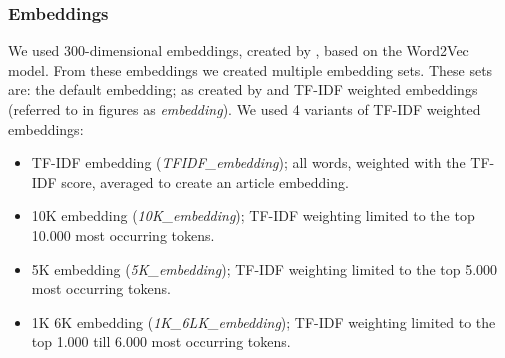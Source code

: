 \documentclass[runningheads]{llncs}
\begin{document}
\subsubsection{Embeddings}
We used 300-dimensional embeddings, created by \citet{Truong2017Thesis}, based on the Word2Vec model. From these embeddings we created multiple embedding sets. These sets are: the default embedding; as created by \citet{Truong2017Thesis} and TF-IDF weighted embeddings (referred to in figures as \textit{embedding}). We used 4 variants of TF-IDF weighted embeddings: 
\begin{itemize}
\item{TF-IDF embedding (\textit{TFIDF\_embedding}); all words, weighted with the TF-IDF score, averaged to create an article embedding.}
\item{10K embedding (\textit{10K\_embedding}); TF-IDF weighting limited to the top 10.000 most occurring tokens.}
\item{5K embedding (\textit{5K\_embedding}); TF-IDF weighting limited to the top 5.000 most occurring tokens.}
\item{1K 6K embedding (\textit{1K\_6LK\_embedding}); TF-IDF weighting limited to the top 1.000 till 6.000 most occurring tokens.}
\end{itemize}
\end{document}
